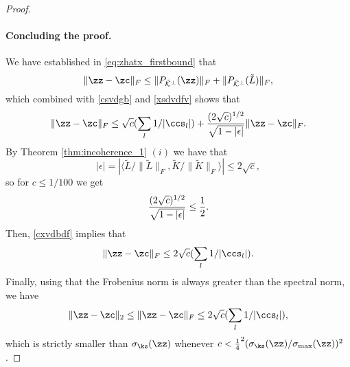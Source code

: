 \begin{proof}
\paragraph{Concluding the proof.} %
We have established in \eqref{eq:zhatx_firstbound} that 
$$ \| \zz - \zc \|_F  \leq \| P_{\tilde{\mathcal{K}}^\perp} (\zz) \|_F + \| P_{\tilde{\mathcal{K}}^\perp}(\tilde{L}) \|_F,$$
which combined with \eqref{csvdgb} and \eqref{xsdvdfv}  shows that
\begin{equation}\label{cxvdbdf}
\| \zz - \zc \|_F \leq \sqrt{c} (\sum_l 1/|\ccs_l|) + { (2\sqrt{c})^{1/2}\over \sqrt{1-|\epsilon|}} \| \zz - \zc \|_F.
\end{equation}
By Theorem \ref{thm:incoherence_1} $(i)$ we have that 
$$|\epsilon| =|\langle \tilde{L} / \|\tilde{L}\|_F, \tilde{K} / \|\tilde{K}\|_F \rangle| \leq 2 \sqrt{c},$$ so for $c\le 1/100$ we get 
$${ (2\sqrt{c})^{1/2}\over \sqrt{1-|\epsilon|}}  \leq { 1\over 2}.$$
 Then,   \eqref{cxvdbdf} implies  that 
$$\| \zz - \zc \|_F \leq 2 \sqrt{c} (\sum_l 1/|\ccs_l|).$$
 Finally, using that  the Frobenius norm is always greater than the spectral norm, we have
$$
\| \zz - \zc \|_2 \leq \| \zz - \zc \|_F \leq 2 \sqrt{c} (\sum_l 1/|\ccs_l|),
$$
which is strictly smaller than $\sigma_{\ks}(\zz)$ whenever $c < \frac{1}{4} ^2 (\sigma_{\ks}(\zz)/\sigma_{\max}(\zz))^{2} $.
\end{proof}

